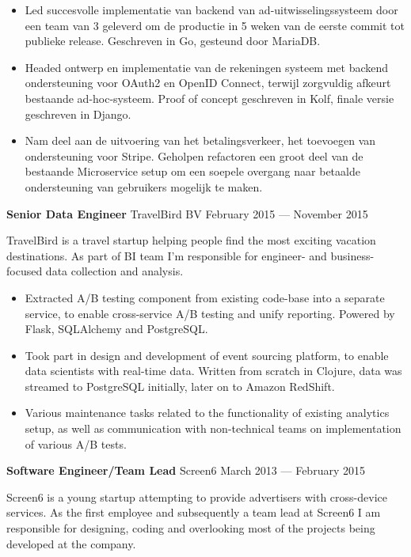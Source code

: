 \documentclass[margin]{res}
\begin{document}
\begin{resume}
\begin{itemize} \itemsep -1pt
\item Led succesvolle implementatie van backend van
  ad-uitwisselingssysteem door een team van 3 geleverd om de productie
  in 5 weken van de eerste commit tot publieke release. Geschreven in
  Go, gesteund door MariaDB.
\item Headed ontwerp en implementatie van de rekeningen systeem met backend
   ondersteuning voor OAuth2 en OpenID Connect, terwijl zorgvuldig afkeurt
   bestaande ad-hoc-systeem. Proof of concept geschreven in Kolf, finale
   versie geschreven in Django.
 \item Nam deel aan de uitvoering van het betalingsverkeer, het
   toevoegen van ondersteuning voor Stripe. Geholpen refactoren een
   groot deel van de bestaande Microservice setup om een soepele
   overgang naar betaalde ondersteuning van gebruikers mogelijk te
   maken.
\end{itemize}

{\bf Senior Data Engineer} TravelBird BV \hfill February 2015 --- November 2015

TravelBird is a travel startup helping people find the most exciting
vacation destinations. As part of BI team I'm responsible for
engineer- and business-focused data collection and analysis.\\

\begin{itemize} \itemsep -1pt
\item Extracted A/B testing component from existing code-base into a
  separate service, to enable cross-service A/B testing and unify
  reporting. Powered by Flask, SQLAlchemy and PostgreSQL.
\item Took part in design and development of event sourcing platform,
  to enable data scientists with real-time data. Written from scratch
  in Clojure, data was streamed to PostgreSQL initially, later on to
  Amazon RedShift.
\item Various maintenance tasks related to the functionality of
  existing analytics setup, as well as communication with
  non-technical teams on implementation of various A/B tests.
\end{itemize}

{\bf Software Engineer/Team Lead} Screen6 \hfill March 2013 --- February 2015

Screen6 is a young startup attempting to provide advertisers with
cross-device services. As the first employee and subsequently a team
lead at Screen6 I am responsible for designing, coding and overlooking
most of the projects being developed at the company.\\


\end{resume}
\end{document}
